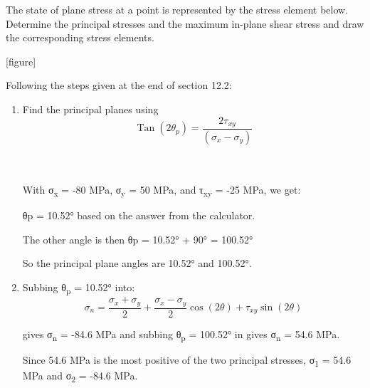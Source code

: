 \documentclass[
  letterpaper,
  DIV=11,
  numbers=noendperiod]{scrreprt}
\begin{document}
\begin{tcolorbox}[enhanced jigsaw, breakable, opacityback=0, toptitle=1mm, left=2mm, colback=white, opacitybacktitle=0.6, colframe=quarto-callout-note-color-frame, titlerule=0mm, arc=.35mm, leftrule=.75mm, bottomtitle=1mm, colbacktitle=quarto-callout-note-color!10!white, rightrule=.15mm, title={Example 12.3:}, bottomrule=.15mm, toprule=.15mm, coltitle=black]

The state of plane stress at a point is represented by the stress
element below. Determine the principal stresses and the maximum in-plane
shear stress and draw the corresponding stress elements.

{[}figure{]}

\begin{tcolorbox}[enhanced jigsaw, breakable, opacityback=0, toptitle=1mm, left=2mm, colback=white, opacitybacktitle=0.6, colframe=quarto-callout-note-color-frame, titlerule=0mm, arc=.35mm, leftrule=.75mm, bottomtitle=1mm, colbacktitle=quarto-callout-note-color!10!white, rightrule=.15mm, title={Solution}, bottomrule=.15mm, toprule=.15mm, coltitle=black]

Following the steps given at the end of section 12.2:

\begin{enumerate}
\def\labelenumi{\arabic{enumi}.}
\item
  Find the principal planes using\\
  \[
  \operatorname{Tan}\left(2 \theta_p\right)=\frac{2 \tau_{x y}}{\left(\sigma_x-\sigma_y\right)}
  \]\\
  \strut \\
  With σ\textsubscript{x} = -80 MPa, σ\textsubscript{y} = 50 MPa, and
  τ\textsubscript{xy} = -25 MPa, we get:

  θp = 10.52° based on the answer from the calculator.

  The other angle is then θp = 10.52° + 90° = 100.52°

  So the principal plane angles are 10.52° and 100.52°.
\item
  Subbing θ\textsubscript{p} = 10.52° into:\\
  \[
  \sigma_n=\frac{\sigma_x+\sigma_y}{2}+\frac{\sigma_x-\sigma_y}{2} \cos (2 \theta)+\tau_{x y} \sin (2 \theta)
  \]

  gives σ\textsubscript{n} = -84.6 MPa and subbing θ\textsubscript{p} =
  100.52° in gives σ\textsubscript{n} = 54.6 MPa.

  Since 54.6 MPa is the most positive of the two principal stresses,
  σ\textsubscript{1} = 54.6 MPa and σ\textsubscript{2} = -84.6 MPa.


\end{enumerate}
\end{tcolorbox}
\end{tcolorbox}
\end{document}
